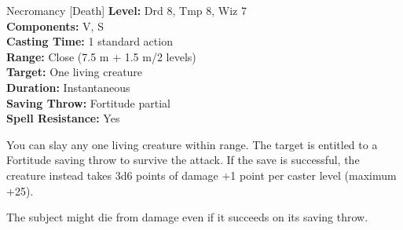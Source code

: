 {Necromancy [Death]}
{
	\textbf{Level:}
	Drd 8, Tmp 8, Wiz 7\\
	\textbf{Components:}
	V, S\\
	\textbf{Casting Time:}
	1 standard action\\
	\textbf{Range:}
	Close (7.5 m + 1.5 m/2 levels)\\
	\textbf{Target:}
	One living creature\\
	\textbf{Duration:}
	Instantaneous\\
	\textbf{Saving Throw:}
	Fortitude partial\\
	\textbf{Spell Resistance:}
	Yes\\
}
{
	You can slay any one living creature within range. The target is entitled to a Fortitude saving throw to survive the attack. If the save is successful, the creature instead takes 3d6 points of damage +1 point per caster level (maximum +25).

	The subject might die from damage even if it succeeds on its saving throw.

}
